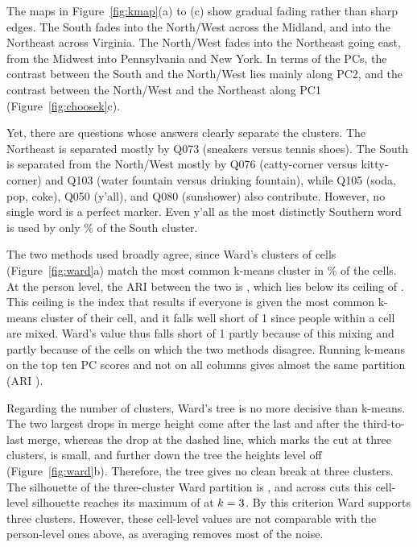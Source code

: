 \documentclass[10pt,letterpaper]{article}
\begin{document}
The maps in Figure~\ref{fig:kmap}(a) to (c) show gradual fading rather than sharp edges. The South fades into the North/West across the Midland, and into the Northeast across Virginia. The North/West fades into the Northeast going east, from the Midwest into Pennsylvania and New York. In terms of the PCs, the contrast between the South and the North/West lies mainly along PC2, and the contrast between the North/West and the Northeast along PC1 (Figure~\ref{fig:choosek}c).

Yet, there are questions whose answers clearly separate the clusters. The Northeast is separated mostly by Q073 (sneakers versus tennis shoes). The South is separated from the North/West mostly by Q076 (catty-corner versus kitty-corner) and Q103 (water fountain versus drinking fountain), while Q105 (soda, pop, coke), Q050 (y'all), and Q080 (sunshower) also contribute. However, no single word is a perfect marker. Even y'all as the most distinctly Southern word is used by only \clTopSouthTwoIn\% of the South cluster.

The two methods used broadly agree, since Ward's clusters of cells (Figure~\ref{fig:ward}a) match the most common k-means cluster in \clCellAgreePct\% of the cells. At the person level, the ARI between the two is \clARIWard, which lies below its ceiling of \clARIDomCell. This ceiling is the index that results if everyone is given the most common k-means cluster of their cell, and it falls well short of 1 since people within a cell are mixed. Ward's value thus falls short of 1 partly because of this mixing and partly because of the cells on which the two methods disagree. Running k-means on the top ten PC scores and not on all \drP{} columns gives almost the same partition (ARI \clARIkmPC).

Regarding the number of clusters, Ward's tree is no more decisive than k-means. The two largest drops in merge height come after the last and after the third-to-last merge, whereas the drop at the dashed line, which marks the cut at three clusters, is small, and further down the tree the heights level off (Figure~\ref{fig:ward}b). Therefore, the tree gives no clean break at three clusters. The silhouette of the three-cluster Ward partition is \clWardSilThree, and across cuts this cell-level silhouette reaches its maximum of \clWardSilBest{} at $k=3$. By this criterion Ward supports three clusters. However, these cell-level values are not comparable with the person-level ones above, as averaging removes most of the noise.
\end{document}
